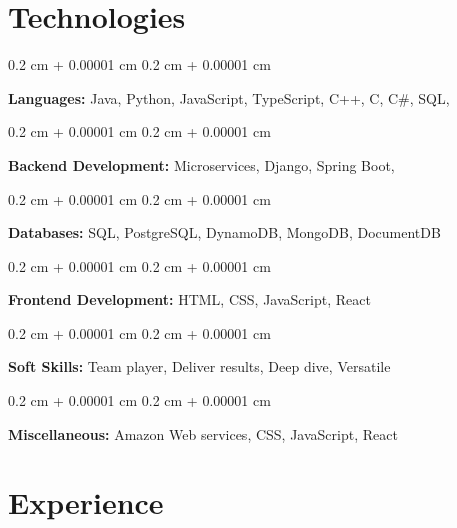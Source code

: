 \documentclass[10pt, letterpaper]{article}
\newenvironment{onecolentry}{
    \begin{adjustwidth}{
        0.2 cm + 0.00001 cm
    }{
        0.2 cm + 0.00001 cm
    }
}{
    \end{adjustwidth}
} %
\begin{document}
    \section{Technologies}

        \begin{onecolentry}
            \textbf{Languages:} Java, Python, JavaScript, TypeScript, C++, C, C\#, SQL, 
        \end{onecolentry}

        \vspace{0.2 cm}

        \begin{onecolentry}
            \textbf{Backend Development:} Microservices, Django, Spring Boot, 
        \end{onecolentry}

        \vspace{0.2 cm}

        \begin{onecolentry}
            \textbf{Databases:} SQL, PostgreSQL, DynamoDB, MongoDB, DocumentDB 
        \end{onecolentry}

        \vspace{0.2 cm}

        \begin{onecolentry}
            \textbf{Frontend Development:} HTML, CSS, JavaScript, React 
        \end{onecolentry}

        \vspace{0.2 cm}

        \begin{onecolentry}
            \textbf{Soft Skills:} Team player, Deliver results, Deep dive, Versatile  
        \end{onecolentry}
        
        \vspace{0.2 cm}
        
        \begin{onecolentry}
            \textbf{Miscellaneous:} Amazon Web services, CSS, JavaScript, React 
        \end{onecolentry}
    
    \section{Experience}
        
\end{document}

